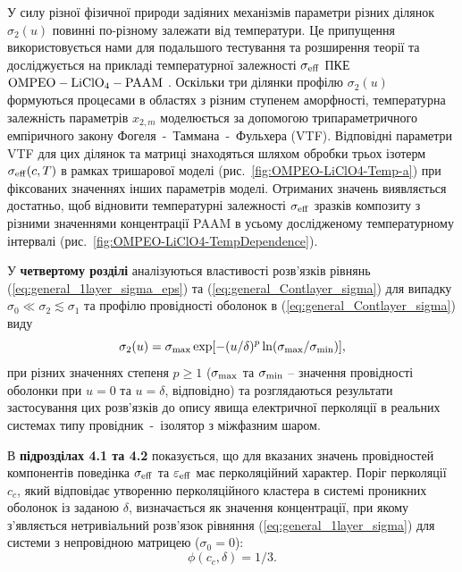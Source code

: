 \documentclass[twoside,a4paper,14pt]{vakaref-utf8}
\begin{document}
У силу різної фізичної природи задіяних механізмів параметри різних ділянок $\sigma_2(u)$ повинні по-різному залежати від температури. Це припущення використовується нами для подальшого тестування та розширення теорії та досліджується на прикладі температурної залежності $\sigma_{\rm eff}$ ПКЕ $\rm OMPEO-LiClO_4-PAAM$ \cite{Wiec1994}. 
Оскільки три ділянки профілю $\sigma_2(u)$  формуються процесами в  областях з різним ступенем аморфності, температурна залежність параметрів $x_{2,m}$ моделюється за допомогою трипараметричного емпіричного закону Фогеля~-~Таммана~-~Фульхера (VTF).
Відповідні параметри VTF для цих ділянок та матриці знаходяться шляхом обробки трьох ізотерм $\sigma_{\rm eff} (c,T)$ в рамках тришарової моделі (рис.~\ref{fig:OMPEO-LiClO4-Temp-a}) при фіксованих значеннях інших параметрів моделі. 
Отриманих значень виявляється достатньо, щоб відновити температурні залежності $\sigma_{\rm eff}$ зразків композиту з різними значеннями концентрації PAAM в усьому дослідженому температурному інтервалі (рис.~\ref{fig:OMPEO-LiClO4-TempDependence}). 

У {\bf четвертому розділі} аналізуються властивості розв'язків рівнянь (\ref{eq:general_1layer_sigma_eps}) та (\ref{eq:general_Contlayer_sigma}) для випадку $\sigma_0 \ll \sigma_2 \lesssim \sigma_1$ та профілю провідності оболонок в (\ref{eq:general_Contlayer_sigma}) виду
\begin{equation}\label{eq:profile-perc}
\sigma_2 (u) = \sigma_{\rm max} \exp [-(u/\delta)^p \ln(\sigma_{\rm max}/\sigma_{\rm min})],
\end{equation}
при різних значеннях степеня $p\geq 1$ ($\sigma_{\rm max}$ та $\sigma_{\rm min}$ -- значення провідності оболонки при $u=0$
та $u=\delta$, відповідно) та розглядаються результати застосування цих розв'язків до опису явища електричної перколяції в реальних системах типу провідник~-~ізолятор з міжфазним шаром.

В {\bf підрозділах 4.1 та 4.2} показується, що для вказаних значень провідностей ком\-понентів поведінка $\sigma_{\rm eff}$ та $\varepsilon_{\rm eff}$ має перколяційний характер. Поріг перколяції $c_c$, який відповідає утворенню перколяційного кластера в системі проникних оболонок із заданою $\delta$, визначається як значення концентрації, при якому з'являється нетривіальний розв'язок рівняння (\ref{eq:general_1layer_sigma}) для системи з непровідною матрицею ($\sigma_0 = 0$):
\begin{equation}\label{eq:threshold}
\phi(c_c, \delta) = 1/3.
\end{equation}
\end{document}
